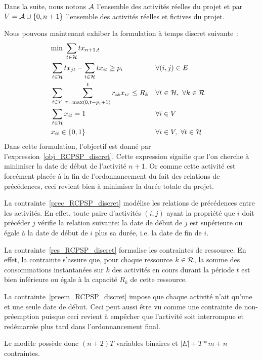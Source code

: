 Dans la suite, nous notons ${\cal A}$ l'ensemble des
activités réelles du projet et par $V={\cal A} \cup \{0,n+1\}$
l'ensemble des activités réelles et fictives du projet.

Nous pouvons maintenant exhiber la formulation à temps discret
suivante~\cite{ex_RCPSP_discret}:
{\small \begin{align} &\text{min }
\sum_{t \in {\cal H}} tx_{n+1,t} \label{obj_RCPSP_discret}\\
&\sum_{t \in {\cal H}} tx_{jt} - \sum_{t \in {\cal H}} tx_{it} \ge p_i &
&\forall (i,j) \in E \label{prec_RCPSP_discret}\\ &\sum_{i \in
V}\,\sum_{\tau=\max(0,t-p_i+1)}^t r_{ik}x_{i\tau} \le R_k& &\forall t\in
{\cal H},\ \forall k \in {\cal R} \label{res_RCPSP_discret}\\
&\sum_{t\in {\cal H}} x_{it}=1& & \forall i \in V
\label{preem_RCPSP_discret}\\ & x_{it} \in \{0,1\} & &\forall i
\in V,\ \forall t \in {\cal H} \end{align}
 } 
Dans cette formulation, l'objectif est donné par
l'expression~\eqref{obj_RCPSP_discret}. Cette expression signifie que
l'on cherche à minimiser la date de début de l'activité $n+1$. Or
comme cette activité est forcément placée à la fin de
l'ordonnancement du fait des relations de précédences, ceci
revient bien à minimiser la durée totale du projet.

La contrainte~\eqref{prec_RCPSP_discret} modélise les relations de
précédences entre les activités. En effet, toute paire d'activités
$(i,j)$ ayant la propriété que $i$ doit précéder $j$ vérifie la
relation suivante: la date de début de $j$ est supérieure ou égale
à la date de début de $i$ plus sa durée, i.e. la date de fin de
$i$.

La contrainte~\eqref{res_RCPSP_discret} formalise les contraintes de
ressource. En effet, la contrainte s'assure que, pour chaque ressource
$k \in {\cal R}$, la somme des consommations instantanées sur $k$ des
activités en cours durant la période $t$ est bien inférieure ou égale à la
capacité $R_k$ de cette ressource.

La contrainte~\eqref{preem_RCPSP_discret} impose que chaque activité
n'ait qu'une et une seule date de début. Ceci peut aussi être vu comme
une contrainte de non-préemption puisque ceci revient à empêcher que
l'activité soit interrompue et redémarrée plus tard dans
l'ordonnancement final.

Le modèle possède donc $(n+2)T$ variables binaires et
$|E|+T*m+n$ contraintes.

